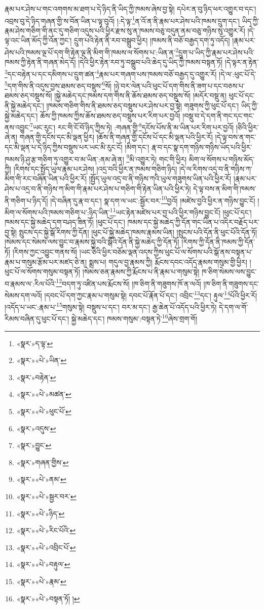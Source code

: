 རྣམ་པར་ཤེས་པ་གང་འགགས་མ་ཐག་པ་དེ་ཉིད་ནི་ཡིད་ཀྱི་ཁམས་ཞེས་བྱ་སྟེ། དཔེར་ན་བུ་ཉིད་ཕར་འགྱུར་བ་དང་། འབྲས་བུ་དེ་ཉིད་གཞན་གྱི་ས་བོན་ཡིན་པ་ལྟ་བུའོ། །:དེ་ལྟ་\footnote{«སྣར་»ད་ལྟ་}ན་འོ་ན་ནི་རྣམ་པར་ཤེས་པའི་ཁམས་དྲུག་དང་། ཡིད་ཀྱི་རྣམ་ཤེས་གཅིག་གི་ནང་དུ་གཅིག་འདུས་པའི་ཕྱིར་རྫས་སུ་ན་ཁམས་བཅུ་བདུན་ནམ་བཅུ་གཉིས་སུ་འགྱུར་རོ། །དེ་ལྟ་འང་ཡིན་མོད་ཀྱི་འོན་ཀྱང་། དྲུག་པའི་རྟེན་ནི་རབ་བསྒྲུབ་ཕྱིར། །ཁམས་ནི་བཅོ་བརྒྱད་དག་ཏུ་འདོད། །རྣམ་པར་ཤེས་པའི་ཁམས་ལྔ་པོ་དག་གི་རྟེན་ལྔ་ནི་མིག་གི་ཁམས་ལ་སོགས་པ་:ཡིན་ན་\footnote{«སྣར་»«པེ་»ཡིན་}དྲུག་པ་ཡིད་ཀྱི་རྣམ་པར་ཤེས་པའི་ཁམས་ཀྱི་རྟེན་ནི་གཞན་མེད་དོ། །དེའི་ཕྱིར་རྟེན་རབ་ཏུ་བསྒྲུབ་པའི་ཆེད་དུ་ཡིད་ཀྱི་ཁམས་བསྟན་ཏོ། །དེ་ལྟར་ན་རྟེན་\footnote{«སྣར་»བརྟེན་}དང་བརྟེན་པ་དང་དམིགས་པ་དྲུག་ཚན་\footnote{«སྣར་»«པེ་»མཚན་}རྣམ་པར་གཞག་པས་ཁམས་བཅོ་བརྒྱད་དུ་འགྱུར་རོ། །དེ་ལ་:ཕུང་པོ་དེ་\footnote{«སྣར་»«པེ་»ཕུང་པོ་}དག་གིས་ནི་འདུས་བྱས་ཐམས་ཅད་བསྡུས་\footnote{«སྣར་»འདུས་}སོ། །ཉེ་བར་ལེན་པའི་ཕུང་པོ་དག་གིས་ནི་ཟག་པ་དང་བཅས་པ་ཐམས་ཅད་བསྡུས་སོ། །སྐྱེ་མཆེད་དང་ཁམས་དག་གིས་ནི་ཆོས་ཐམས་ཅད་བསྡུས་སོ། །མདོར་བསྡུ་ན། ཕུང་པོ་དང་ནི་སྐྱེ་མཆེད་དང་། །ཁམས་གཅིག་གིས་ནི་ཐམས་ཅད་བསྡུས་པར་ཤེས་པར་བྱ་སྟེ། གཟུགས་ཀྱི་ཕུང་པོ་དང་། ཡིད་ཀྱི་སྐྱེ་མཆེད་དང་། ཆོས་ཀྱི་ཁམས་ཀྱིས་ཆོས་ཐམས་ཅད་བསྡུས་པར་རིག་པར་བྱའོ། །བསྡུ་བ་དེ་དག་ནི་གང་དང་གང་ནས་འབྱུང་\footnote{«སྣར་»བྱུང་}ཡང་རུང་། རང་གི་ངོ་བོ་ཉིད་ཀྱིས་ཏེ། :གཞན་གྱི་\footnote{«སྣར་»གཞན་གྱིས་}དངོས་པོས་ནི་མ་ཡིན་པར་རིག་པར་བྱའོ། །ཅིའི་ཕྱིར་ཞེ་ན། གཞན་གྱི་དངོས་དང་མི་ལྡན་ཕྱིར། །ཆོས་ནི་གཞན་གྱི་དངོས་པོ་དང་མི་ལྡན་པའི་ཕྱིར་རོ། །དེ་ལྟ་བས་ན་གང་དང་མི་ལྡན་པ་དེ་ཉིད་ཀྱིས་བསྡུས་པར་ཡང་མི་རུང་ངོ། །མིག་དང་། རྣ་བ་དང་སྣ་དག་གཉིས་གཉིས་ཡོད་པའི་ཕྱིར་ཁམས་ཉི་ཤུ་རྩ་གཅིག་ཏུ་འགྱུར་བ་མ་ཡིན་:ནམ་ཞེ་ན། \footnote{«སྣར་»«པེ་»ནམ་}མི་འགྱུར་ཏེ། གང་གི་ཕྱིར། མིག་ལ་སོགས་པ་གཉིས་མོད་ཀྱི། །རིགས་དང་སྤྱོད་ཡུལ་རྣམ་པར་ཤེས། །འདྲ་བའི་ཕྱིར་ན་ཁམས་གཅིག་ཉིད། །དེ་ལ་རིགས་འདྲ་བ་ནི་གཉིས་ཀ་མིག་གི་རང་བཞིན་ཡིན་པའི་ཕྱིར་རོ། །སྤྱོད་ཡུལ་འདྲ་བ་ནི་གཉིས་ཀའི་ཡུལ་གཟུགས་ཡིན་པའི་ཕྱིར་རོ། །རྣམ་པར་ཤེས་པ་འདྲ་བ་ནི་གཉིས་ཀ་མིག་གི་རྣམ་པར་ཤེས་པ་གཅིག་གི་རྟེན་ཡིན་པའི་ཕྱིར་ཏེ། དེ་ལྟ་བས་ན་མིག་གི་ཁམས་ནི་གཅིག་པ་ཉིད་དོ། །དེ་བཞིན་དུ་རྣ་བ་དང་། སྣ་དག་ལ་ཡང་:སྦྱོར་བར་\footnote{«སྣར་»«པེ་»སྦྱར་བར་}བྱའོ། །མཛེས་བྱའི་ཕྱིར་ན་གཉིས་བྱུང་ངོ། །མིག་ལ་སོགས་པའི་ཁམས་གཅིག་པ་:ཉིད་ཡིན་\footnote{«སྣར་»«པེ་»ཉིད་}ཡང་རྟེན་མཛེས་པར་བྱ་པའི་ཕྱིར་གཉིས་བྱུང་ངོ། །ཕུང་པོ་དང་། ཁམས་དང་སྐྱེ་མཆེད་དག་བཤད་ཟིན་ཏོ། །ཕུང་པོ་དང་། ཁམས་དང་སྐྱེ་མཆེད་ཀྱི་དོན་གང་ཡིན་པ་འདིར་བརྗོད་པར་བྱ་སྟེ། སྤུངས་དང་སྐྱེ་སྒོ་རིགས་ཀྱི་དོན། །ཕུང་པོ་སྐྱེ་མཆེད་ཁམས་རྣམས་ཡིན། །སྤུངས་པའི་དོན་ནི་ཕུང་པོའི་དོན་ཏོ། །སེམས་དང་སེམས་ལས་བྱུང་བ་རྣམས་སྐྱེ་བའི་སྒོའི་དོན་ནི་སྐྱེ་མཆེད་ཀྱི་དོན་ཏོ། །རིགས་ཀྱི་དོན་ནི་ཁམས་ཀྱི་དོན་ཏོ། །རིགས་ཀྱང་འབྱུང་གནས་སོ། །ཡང་ཅིའི་ཕྱིར་བཅོམ་ལྡན་འདས་ཀྱིས་ཕུང་པོ་ལ་སོགས་པའི་སྒོ་ནས་བསྟན་པ་རྣམ་པ་གསུམ་རྩོམ་པར་མཛད་ཅེ་ན། སྨྲས་པ། གདུལ་བྱ་རྣམས་ཀྱི། རྨོངས་དབང་འདོད་རྣམས་གསུམ་གྱི་ཕྱིར། །ཕུང་པོ་ལ་སོགས་གསུམ་བསྟན་ཏོ། །སེམས་ཅན་རྣམས་ཀྱི་རྨོངས་པ་ནི་རྣམ་པ་གསུམ་སྟེ། ཁ་ཅིག་སེམས་ལས་བྱུང་བ་རྣམས་ལ་:རིལ་པོའི་\footnote{«སྣར་»«པེ་»རིང་པོའི་}བདག་ཏུ་འཛིན་པས་རྨོངས་སོ། །ཁ་ཅིག་ནི་གཟུགས་ཁོ་ན་ལའོ། །ཁ་ཅིག་ནི་གཟུགས་དང་སེམས་དག་ལའོ། །དབང་པོ་དག་ཀྱང་རྣམ་པ་གསུམ་སྟེ། དབང་པོ་རྣོན་པོ་དང་། འབྲིང་\footnote{«སྣར་»«པེ་»འབྲིང་པོ་}དང་། རྟུལ་\footnote{«སྣར་»«པེ་»བརྟུལ་}པོའི་ཕྱིར་རོ། །འདོད་པ་ཡང་:རྣམ་པ་\footnote{«སྣར་»«པེ་»རྣམ་}གསུམ་སྟེ། བསྡུས་པ་དང་། བར་མ་དང་། རྒྱ་ཆེན་པོ་འདོད་པའི་ཕྱིར་ཏེ། དེ་དག་ལ་གོ་རིམས་བཞིན་དུ་ཕུང་པོ་དང་། སྐྱེ་མཆེད་དང་། ཁམས་གསུམ་:བསྟན་ཏེ་\footnote{«སྣར་»«པེ་»བསྟན་ཏོ། །}ཞེས་གྲག་གོ། 